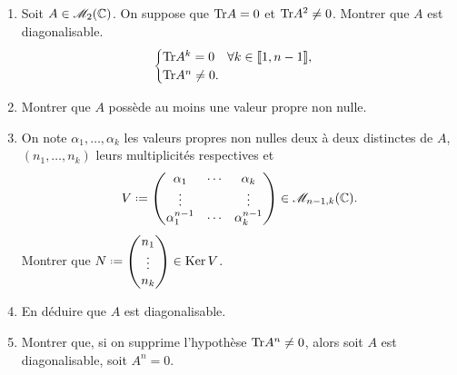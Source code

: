 \begin{exercice}
    \begin{enumerate}
        \item Soit $A \in \mathscr{M}_2(\mathbb{C})$. On suppose que $\mathrm{Tr}{A} = 0$ et $\mathrm{Tr}{A}^2 \not=0$. Montrer que $A$ est diagonalisable. \\
        $$
        \begin{cases}
            \mathrm{Tr}{A^k}= 0 \quad \forall k \in \llbracket 1, n-1 \rrbracket, \\
            \mathrm{Tr}{A^n}\not=0.
        \end{cases}
        $$
        \item Montrer que $A$ possède au moins une valeur propre non nulle. 
        \item On note $\alpha_1, \dots, \alpha_k$ les valeurs propres non nulles deux à deux distinctes de $A$, $(n_1, \dots, n_k)$ leurs multiplicités respectives et 
        $$
        V \defeq \begin{pmatrix}
            \alpha_1 & \cdots & \alpha_k \\
            \vdots & & \vdots \\
            \alpha_1^{n-1} & \cdots & \alpha_k^{n-1}
        \end{pmatrix}
        \in \M_{n-1,k}(\C).
        $$
        Montrer que $N \defeq \begin{pmatrix} n_1  \\ \vdots \\ n_k \end{pmatrix} \in \Ker{V}$.
        \item En déduire que $A$ est diagonalisable.
        \item Montrer que, si on supprime l'hypothèse $\mathrm{Tr}{A^n} \not=0$, alors soit $A$ est diagonalisable, soit $A^n = 0$.
    \end{enumerate}
\end{exercice}

\newcommand{\vandermondepartiel}{
\left(\begin{gathered}
    \tikzpicture[every node/.style={anchor=south west}]
        \node[minimum width=1.5cm,minimum height=0.5cm] at (0.125,1.25) {\LARGE $V_k$};
        
        \node[minimum width=0.5cm,minimum height=0.5cm] at (0,0) {$\star$};
        \node[minimum width=0.5cm,minimum height=0.5cm] at (0.55,0) {$\cdots$};
        \node[minimum width=0.5cm,minimum height=0.5cm] at (1.25,0) {$\star$};
        
        \node[minimum width=0.5cm,minimum height=0.5cm] at (0,0.375) {$\vdots$};
        \node[minimum width=0.5cm,minimum height=0.5cm] at (1.25,0.375) {$\vdots$};
        
        \node[minimum width=0.5cm,minimum height=0.5cm] at (0,0.75) {$\star$};
        \node[minimum width=0.5cm,minimum height=0.5cm] at (0.55,0.75) {$\cdots$};
        \node[minimum width=0.5cm,minimum height=0.5cm] at (1.25,0.75) {$\star$};

        \draw (0, 1.25) -- (1.75, 1.25);
    \endtikzpicture
    \end{gathered}\right)
}

